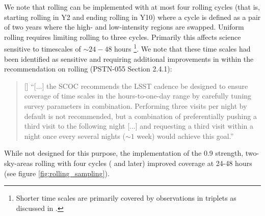 We note that rolling can be implemented with at most four rolling cycles (that is, starting rolling in Y2 and ending rolling in Y10) where a cycle is defined as a pair of two years where the high- and low-intensity regions are swapped. Uniform rolling requires limiting rolling to three cycles. Primarily this affects science sensitive to timescales of $\sim24-48$ hours \footnote{Shorter time scales are primarily covered by observations in triplets as discussed in .}. 
We note that these time scales had been identified as sensitive and requiring additional improvements in  within the recommendation on rolling (PSTN-055 Section 2.4.1): 

\begin{quote}
[] ``[...] the SCOC recommends the LSST cadence
be designed to ensure coverage of time scales in the hours-to-one-day range by carefully tuning survey parameters in combination. Performing three visits per night by default is not recommended, but a combination of preferentially pushing a third visit to the following night [...] and requesting a third visit within a night once every several nights ($\sim 1$ week) would achieve this goal.'' 
\end{quote}

While not designed for this purpose, the implementation of the 0.9 strength, two-sky-areas rolling with four cycles ( and later) improved coverage at 24-48 hours (see figure \autoref{fig:rolling_sampling}).


